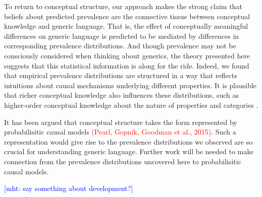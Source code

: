 \documentclass[12pt,letterpaper]{article}
\newcommand{\red}[1]{\textcolor{Red}{#1}}
\newcommand{\mht}[1]{\textcolor{Blue}{[mht: #1]}}
\begin{document}

To return to conceptual structure, our approach makes the strong claim that beliefs about predicted prevalence are the connective tissue between conceptual knowledge and generic language.
That is, the effect of conceptually meaningful differences on generic language is predicted to be mediated by differences in corresponding prevalence distributions.
And though prevalence may not be consciously considered when thinking about generics, the theory presented here suggests that this statistical information is along for the ride. 
Indeed, we found that empirical prevalence distributions are structured in a way that reflects intuitions about causal mechanisms underlying different properties.
It is plausible that richer conceptual knowledge also influences these distributions, such as higher-order conceptual knowledge about the nature of properties and categories \cite{Gelman2003,Keil1992}. 

It has been argued that conceptual structure takes the form represented by probabilisitic causal models \red{(Pearl, Gopnik, Goodman et al., 2015)}. 
Such a representation would give rise to the prevalence distributions we observed are so crucial for understanding generic language. 
Further work will be needed to make connection from the prevalence distributions uncovered here to probabilisitic causal models.

\mht{say something about development?}






%
\end{document}
